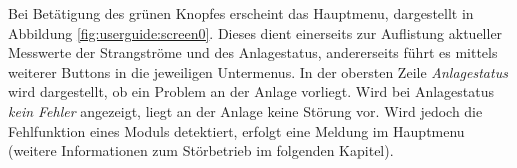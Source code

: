 Bei Bet\"atigung des gr\"unen Knopfes  erscheint das Hauptmenu, dargestellt in
Abbildung \ref{fig:userguide:screen0}. Dieses dient  einerseits zur Auflistung
aktueller  Messwerte der  Strangstr\"ome  und  des Anlagestatus,  andererseits
f\"uhrt  es mittels  weiterer  Buttons in  die  jeweiligen Untermenus. In  der
obersten Zeile  \emph{Anlagestatus} wird  dargestellt, ob  ein Problem  an der
Anlage vorliegt. Wird bei Anlagestatus  \emph{kein Fehler} angezeigt, liegt an
der  Anlage keine  St\"orung vor. Wird  jedoch die  Fehlfunktion eines  Moduls
detektiert,  erfolgt  eine Meldung  im  Hauptmenu  (weitere Informationen  zum
St\"orbetrieb im folgenden Kapitel).

\vspace*{3em}
\noindent{}
\hspace*{0.04\textwidth}
\noindent{}

